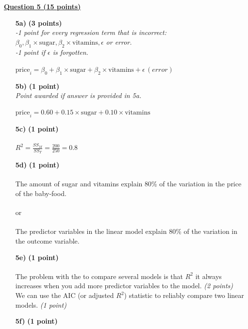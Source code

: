 \underline{\textbf{Question 5 (15 points)}} \\

\begin{itemize}
\item[\textbf{5a)}] \textbf{(3 points)} \\
\textit{-1 point for every regression term that is incorrect: \\$\beta_0, \beta_1 \times \text{sugar}, \beta_2 \times \text{vitamins}, \epsilon$ or error. \\-1 point if $\epsilon$ is forgotten.} \\ \\ 
$\text{price}_i = \beta_0 + \beta_1 \times \text{sugar} + \beta_2 \times \text{vitamins} + \epsilon\, (error)$ \\
\item[\textbf{5b)}] \textbf{(1 point)} \\
\textit{Point awarded if answer is provided in 5a.} \\ \\ 
$\text{price}_i = 0.60 + 0.15 \times \text{sugar} + 0.10 \times \text{vitamins}$ \\
\item[\textbf{5c)}] \textbf{(1 point)} \\ \\ 
$R^2 = \frac{SS_M}{SS_T} = \frac{200}{250} = 0.8$ \\
\item[\textbf{5d)}] \textbf{(1 point)} \\ \\ 
The amount of sugar and vitamins explain 80\% of the variation in the price of the baby-food. \\ \\ 
or \\ \\ 
The predictor variables in the linear model explain 80\% of the variation in the outcome variable. \\
\item[\textbf{5e)}] \textbf{(1 point)} \\ \\
The problem with the to compare several models is that $R^2$ it always \\increases when you add more predictor variables to the model. \textit{(2 points)} \\
We can use the AIC (or adjusted $R^2$) statistic to reliably compare two linear models. \textit{(1 point)} \\
\item[\textbf{5f)}] \textbf{(1 point)} \\ \\

\end{itemize}

